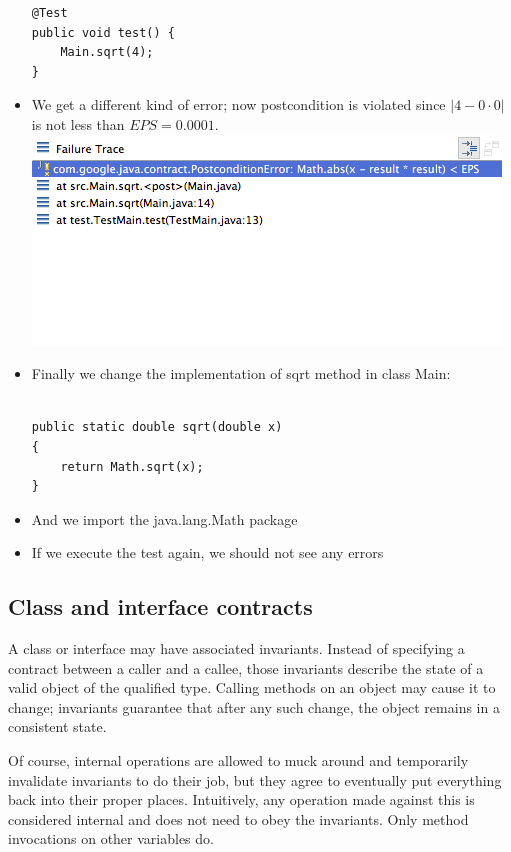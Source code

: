 \documentclass{article}
\begin{document}
\begin{itemize}
\begin{lstlisting}
@Test
public void test() {
	Main.sqrt(4);
}
\end{lstlisting}
\item We get a different kind of error; now postcondition is violated
  since $|4-0\cdot 0|$ is not less than $EPS=0.0001$.\\
\includegraphics[scale=0.7]{Photos/10.png}\\
\item Finally we change the implementation of sqrt method in class Main:
\begin{lstlisting}

public static double sqrt(double x)
{
	return Math.sqrt(x);
}

\end{lstlisting}
\item And we import the java.lang.Math package
\item If we execute the test again, we should not see any errors
\end{itemize}



\subsection{Class and interface contracts}

A class or interface may have associated invariants. Instead of specifying a contract between a caller and a callee, those invariants describe the state of a valid object of the qualified type. Calling methods on an object may cause it to change; invariants guarantee that after any such change, the object remains in a consistent state.

Of course, internal operations are allowed to muck around and temporarily invalidate invariants to do their job, but they agree to eventually put everything back into their proper places. Intuitively, any operation made against this is considered internal and does not need to obey the invariants. Only method invocations on other variables do.
\end{document}
